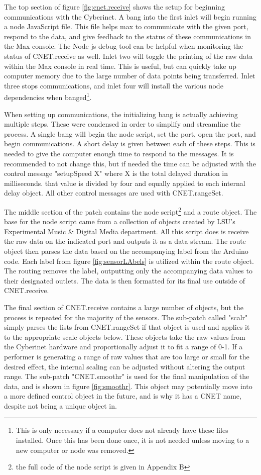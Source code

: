 The top section of figure \ref{fig:cnet.receive} shows the setup for beginning communications with the Cyberinet. A bang into the first inlet will begin running a node JavaScript file. This file helps max to communicate with the given port, respond to the data, and give feedback to the status of these communications in the Max console. The Node js debug tool can be helpful when monitoring the status of CNET.receive as well. Inlet two will toggle the printing of the raw data within the Max console in real time. This is useful, but can quickly take up computer memory due to the large number of data points being transferred. Inlet three stops communications, and inlet four will install the various node dependencies when banged\footnote{This is only necessary if a computer does not already have these files installed. Once this has been done once, it is not needed unless moving to a new computer or node was removed.}. 

When setting up communications, the initializing bang is actually achieving multiple steps. These were condensed in order to simplify and streamline the process. A single bang will begin the node script, set the port, open the port, and begin communications. A short delay is given between each of these steps. This is needed to give the computer enough time to respond to the messages. It is recommended to not change this, but if needed the time can be adjusted with the control message "setupSpeed X" where X is the total delayed duration in milliseconds. that value is divided by four and equally applied to each internal delay object. All other control messages are used with CNET.rangeSet.

The middle section of the patch contains the node script\footnote{the full code of the node script is given in Appendix B} and a route object. The base for the node script came from a collection of objects created by LSU's Experimental Music \& Digital Media department. All this script does is receive the raw data on the indicated port and outputs it as a data stream. The route object then parses the data based on the accompanying label from the Arduino code. Each label from figure \ref{fig:sensorLAbels} is utilized within the route object. The routing removes the label, outputting only the accompanying data values to their designated outlets. The data is then formatted for its final use outside of CNET.receive.

The final section of CNET.receive contains a large number of objects, but the process is repeated for the majority of the sensors. The sub-patch called "scalr" simply parses the lists from CNET.rangeSet if that object is used and applies it to the appropriate scale objects below. These objects take the raw values from the Cyberinet hardware and proportionally adjust it to fit a range of 0-1. If a performer is generating a range of raw values that are too large or small for the desired effect, the internal scaling can be adjusted without altering the output range. The sub-patch "CNET.smoothr" is used for the final manipulation of the data, and is shown in figure \ref{fig:smoothr}. This object may potentially move into a more defined control object in the future, and is why it has a CNET name, despite not being a unique object in.

